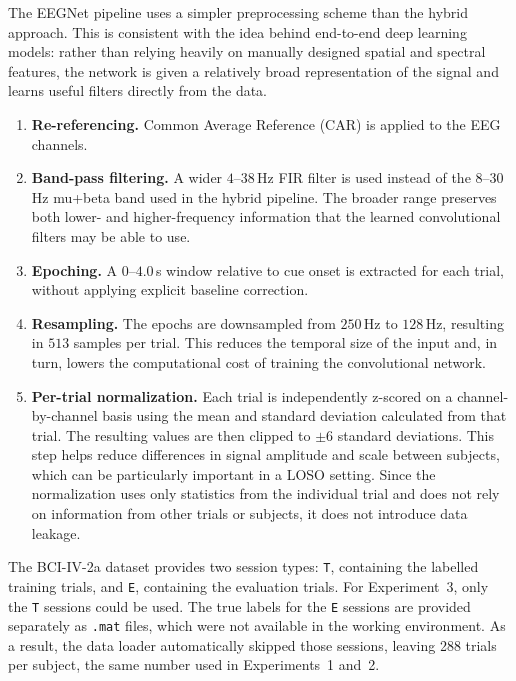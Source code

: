 \documentclass[11pt,a4paper]{article}
\begin{document}
	The EEGNet pipeline uses a simpler preprocessing scheme than the hybrid approach. This is consistent
	with the idea behind end-to-end deep learning models: rather than relying heavily on manually designed
	spatial and spectral features, the network is given a relatively broad representation of the signal
	and learns useful filters directly from the data.
	
	\begin{enumerate}[leftmargin=1.2cm]
		\item \textbf{Re-referencing.}
		Common Average Reference (CAR) is applied to the EEG channels.
		
		\item \textbf{Band-pass filtering.}
		A wider $4$--$38$\,Hz FIR filter is used instead of the $8$--$30$\,Hz mu+beta band used
		in the hybrid pipeline. The broader range preserves both lower- and higher-frequency
		information that the learned convolutional filters may be able to use.
		
		\item \textbf{Epoching.}
		A $0$--$4.0$\,s window relative to cue onset is extracted for each trial, without applying
		explicit baseline correction.
		
		\item \textbf{Resampling.}
		The epochs are downsampled from $250$\,Hz to $128$\,Hz, resulting in $513$ samples per trial.
		This reduces the temporal size of the input and, in turn, lowers the computational cost of
		training the convolutional network.
		
		\item \textbf{Per-trial normalization.}
		Each trial is independently z-scored on a channel-by-channel basis using the mean and standard
		deviation calculated from that trial. The resulting values are then clipped to $\pm 6$
		standard deviations. This step helps reduce differences in signal amplitude and scale between
		subjects, which can be particularly important in a LOSO setting. Since the normalization uses
		only statistics from the individual trial and does not rely on information from other trials
		or subjects, it does not introduce data leakage.
	\end{enumerate}
	
	The BCI-IV-2a dataset provides two session types: \texttt{T}, containing the labelled training
	trials, and \texttt{E}, containing the evaluation trials. For Experiment~3, only the \texttt{T}
	sessions could be used. The true labels for the \texttt{E} sessions are provided separately as
	\texttt{.mat} files, which were not available in the working environment. As a result, the data
	loader automatically skipped those sessions, leaving 288 trials per subject, the same number used
	in Experiments~1 and~2.
	
\end{document}
